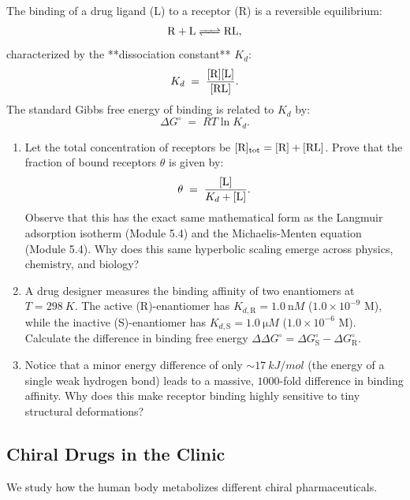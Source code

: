 \documentclass[12pt, a4paper]{book}
\begin{document}
\begin{explobox}
The binding of a drug ligand (L) to a receptor (R) is a reversible equilibrium:
\[
  \ce{R + L <=> RL},
\]
characterized by the **dissociation constant** $K_d$:
\[
  K_d \;=\; \frac{[\ce{R}][\ce{L}]}{[\ce{RL}]}.
\]
The standard Gibbs free energy of binding is related to $K_d$ by:
\[
  \Delta G^\circ \;=\; R T \ln K_d.
\]
\begin{enumerate}[label=(\alph*), leftmargin=*]
  \item Let the total concentration of receptors be $[\ce{R}]_{\text{tot}} = [\ce{R}] + [\ce{RL}]$. Prove that the fraction of bound receptors $\theta$ is given by:
  \[
    \theta \;=\; \frac{[\ce{L}]}{K_d + [\ce{L}]}.
  \]
  Observe that this has the exact same mathematical form as the Langmuir adsorption isotherm (Module 5.4) and the Michaelis-Menten equation (Module 5.4). Why does this same hyperbolic scaling emerge across physics, chemistry, and biology?
  \item A drug designer measures the binding affinity of two enantiomers at $T = \SI{298}{K}$.
        The active (R)-enantiomer has $K_{d,\text{R}} = \SI{1.0}{\nano M}$ ($1.0 \times 10^{-9}$ M), while the inactive (S)-enantiomer has $K_{d,\text{S}} = \SI{1.0}{\micro M}$ ($1.0 \times 10^{-6}$ M).
        Calculate the difference in binding free energy $\Delta \Delta G^\circ = \Delta G^\circ_{\text{S}} - \Delta G^\circ_{\text{R}}$.
  \item Notice that a minor energy difference of only $\sim \SI{17}{kJ/mol}$ (the energy of a single weak hydrogen bond) leads to a massive, $1000$-fold difference in binding affinity. Why does this make receptor binding highly sensitive to tiny structural deformations?
\end{enumerate}
\end{explobox}

\subsection{Chiral Drugs in the Clinic}

We study how the human body metabolizes different chiral pharmaceuticals.
\end{document}
